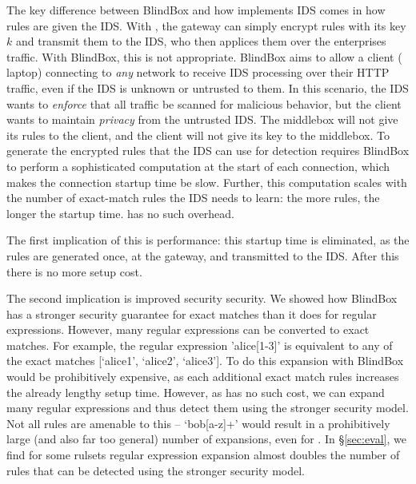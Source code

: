The key difference between BlindBox and how \sys implements IDS comes in how rules are given the IDS.
With \sys, the gateway can simply encrypt rules with its key $k$ and transmit them to the IDS, who then applices them over the enterprises traffic.
With BlindBox, this is not appropriate.
BlindBox aims to allow a client (\eg{} laptop) connecting to {\em any} network to receive IDS processing over their HTTP traffic, even if the IDS is unknown or untrusted to them.
In this scenario, the IDS wants to {\it enforce} that all traffic be scanned for malicious behavior, but the client wants to maintain {\it privacy} from the untrusted IDS.
The middlebox will not give its rules to the client, and the client will not give its key to the middlebox.
 To generate the encrypted rules that the IDS can use for detection requires BlindBox to perform
a sophisticated computation at the start of each connection, which makes the connection
startup time be slow. 
Further, this computation scales with the number of exact-match rules the IDS needs to learn: the more rules, the longer the startup time.
\sys has no such overhead.

The first implication of this is performance: this startup time is eliminated, as the rules are generated once, at the gateway, and transmitted to the IDS. After this there is no more setup cost.

The second implication is improved security security. We showed how BlindBox has a stronger security guarantee for exact matches than it does for regular expressions. However, many regular expressions can be converted to exact matches. 
For example, the regular expression 'alice[1-3]' is equivalent to any of the exact matches [`alice1', `alice2', `alice3'].
To do this expansion with BlindBox would be prohibitively expensive, as each additional exact match rules increases the already lengthy setup time.
However, as \sys has no such cost, we can expand many regular expressions and thus detect them using the stronger security model.
Not all rules are amenable to this -- \eg{} `bob[a-z]+' would result in a prohibitively large (and also far too general) number of expansions, even for \sys. 
In \S\ref{sec:eval}, we find for some rulsets regular expression expansion almost doubles the number of rules that can be detected using the stronger security model.




